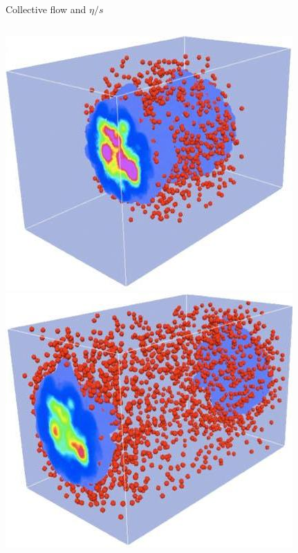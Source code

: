 \documentclass{beamer}
\begin{document}
\begin{frame}{Collective flow and $\eta/s$}
\begin{columns}
    \includegraphics[width=\textwidth]{third_party/evolution3} \\
    \includegraphics[width=\textwidth]{third_party/evolution4} \\

\end{columns}
\end{frame}
\end{document}
